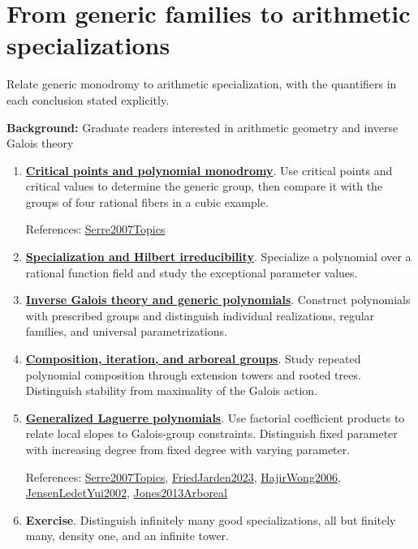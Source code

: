 \documentclass[11pt,a4paper,oneside,openany]{book}
\begin{document}
\section*{From generic families to arithmetic specializations}
Relate generic monodromy to arithmetic specialization, with the quantifiers in each conclusion stated explicitly.\par
\textbf{Background:} Graduate readers interested in arithmetic geometry and inverse Galois theory\par
\begin{enumerate}
\item \textbf{\hyperlink{article:critical-points-monodromy}{Critical points and polynomial monodromy}}. Use critical points and critical values to determine the generic group, then compare it with the groups of four rational fibers in a cubic example.\par
{\footnotesize References: \hyperlink{ref:Serre2007Topics}{Serre2007Topics}}\par
\item \textbf{\hyperlink{article:specialization}{Specialization and Hilbert irreducibility}}. Specialize a polynomial over a rational function field and study the exceptional parameter values.\par
\item \textbf{\hyperlink{article:inverse-galois}{Inverse Galois theory and generic polynomials}}. Construct polynomials with prescribed groups and distinguish individual realizations, regular families, and universal parametrizations.\par
\item \textbf{\hyperlink{article:composition-iteration}{Composition, iteration, and arboreal groups}}. Study repeated polynomial composition through extension towers and rooted trees. Distinguish stability from maximality of the Galois action.\par
\item \textbf{\hyperlink{article:laguerre}{Generalized Laguerre polynomials}}. Use factorial coefficient products to relate local slopes to Galois-group constraints. Distinguish fixed parameter with increasing degree from fixed degree with varying parameter.\par
{\footnotesize References: \hyperlink{ref:Serre2007Topics}{Serre2007Topics}, \hyperlink{ref:FriedJarden2023}{FriedJarden2023}, \hyperlink{ref:HajirWong2006}{HajirWong2006}, \hyperlink{ref:JensenLedetYui2002}{JensenLedetYui2002}, \hyperlink{ref:Jones2013Arboreal}{Jones2013Arboreal}}\par
\item \textbf{Exercise}. Distinguish infinitely many good specializations, all but finitely many, density one, and an infinite tower.\par
\end{enumerate}
\end{document}
